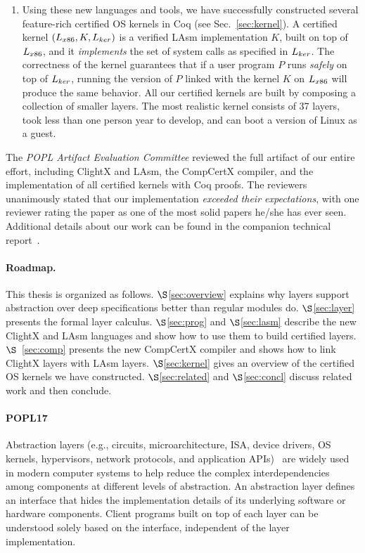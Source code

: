 \begin{enumerate}
\item Using these new languages and tools, we have successfully
  constructed several feature-rich certified OS kernels in Coq (see
  Sec.~\ref{sec:kernel}).  A certified kernel
  $(L_{x86},K,L_{ker})$ is a verified LAsm implementation
  $K$, built on top of $L_{x86}$, and it {\em implements} the set of
  system calls as specified in $L_{ker}$.  The correctness of the
  kernel guarantees that if a user program $P$ runs {\em safely} on
  top of $L_{ker}$, running the version of $P$ linked with the kernel
  $K$ on $L_{x86}$ will produce the same behavior.  All our certified
  kernels are built by composing a collection of smaller layers.
  The most realistic kernel consists of 37 layers, took less than one
  person year to develop, and can boot a version of Linux as a guest.
\end{enumerate}

\noindent{}The {\em POPL Artifact Evaluation Committee} reviewed the
full artifact of our entire effort, including ClightX and LAsm,
the CompCertX compiler, and the implementation of all
certified kernels with Coq proofs. 
The reviewers unanimously stated
that our implementation {\em exceeded their expectations}, with one
reviewer rating the paper as one of the most solid papers he/she has
ever seen. Additional details about our work can be found in
the companion technical report~\cite{dscal14tr}.
%
%

\paragraph{Roadmap.}
This thesis is organized as follows.
$\S$\ref{sec:overview} explains why layers support 
abstraction over deep specifications better than regular modules do.
$\S$\ref{sec:layer} presents the formal layer calculus.
$\S$\ref{sec:prog} and $\S$\ref{sec:lasm} describe the new ClightX and
LAsm languages and show how to use them to build certified layers.
$\S$~\ref{sec:comp} presents the new CompCertX compiler and shows how
to link ClightX layers with LAsm layers.  $\S$\ref{sec:kernel} gives
an overview of the certified OS kernels we have constructed.
$\S$\ref{sec:related} and $\S$\ref{sec:concl} discuss related work and
then conclude.


\paragraph{POPL17}
Abstraction layers (e.g., circuits, microarchitecture, ISA, device
drivers, OS kernels, hypervisors, network protocols, and application
APIs)~\cite{salzer09,baldwin00} are widely used in modern computer
systems to help reduce the complex interdependencies among components
at different levels of abstraction.  An abstraction layer defines an
interface that hides the implementation details of its underlying
software or hardware components. Client programs built on top of each
layer can be understood solely based on the interface, independent of
the layer implementation.

